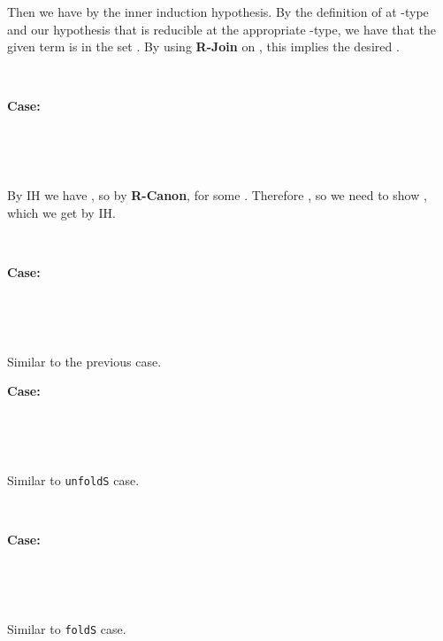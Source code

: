 \documentclass[copyright]{eptcs}
\begin{document}
Then we have  by the inner induction
hypothesis. By the definition of  at -type and
our hypothesis that  is reducible at the appropriate
-type, we have that the given term is in the set . By using \textbf{R-Join} on
, this implies the desired .


\ 

\noindent \textbf{Case:}

\



\ 

\noindent By IH we have , so by \textbf{R-Canon},  for some . Therefore 
, so we need to show , which we get by IH.

\

\noindent \textbf{Case:}

\



\ 

\noindent Similar to the previous case.


\noindent \textbf{Case:}

\



\ 

\noindent Similar to \texttt{unfoldS} case.

\

\noindent \textbf{Case:}

\



\ 

\noindent Similar to \texttt{foldS} case.

\

\fi 
\end{document}
